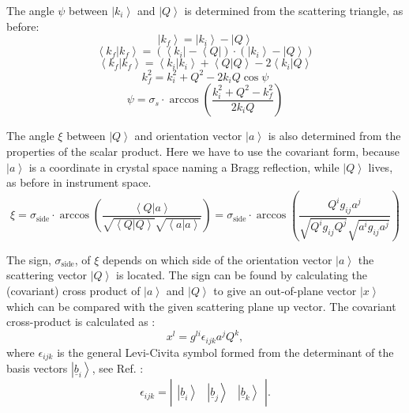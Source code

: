 The angle $\psi$ between $\left| k_i \right>$ and $\left| Q \right>$ is determined from the scattering triangle, as before:
\begin{equation}
	\left| k_f \right> = \left| k_i \right> - \left| Q \right> 
\end{equation}
\begin{equation} 
	\left< k_f | k_f \right> = \left( \left< k_i \right| - \left< Q \right| \right) \cdot \left( \left| k_i \right> - \left| Q \right> \right)
\end{equation}
\begin{equation}
	\left< k_f | k_f \right> = \left< k_i | k_i \right> + \left< Q | Q \right> - 2 \left< k_i | Q \right>
\end{equation}
\begin{equation}
	k_f^2 = k_i^2 + Q^2 - 2 k_i Q \cos \psi 
\end{equation}
\begin{equation}
	\boxed{ \psi = \sigma_s \cdot \arccos \left( \frac{k_i^2 + Q^2 - k_f^2}{2 k_i Q} \right) }
\end{equation}


\vspace{0.5cm}


The angle $\xi$ between $\left| Q \right>$ and orientation vector $\left| a \right>$ is also determined from the properties of the scalar product.
Here we have to use the covariant form, because $\left| a \right>$ is a coordinate in crystal space naming a Bragg reflection, while $\left| Q \right>$ lives, as before in instrument space.
\begin{equation} 
	\boxed{ \xi = 
\sigma_{\mathrm{side}} \cdot \arccos \left( \frac{ \left< Q | a \right> }{ \sqrt{\left< Q | Q \right>} \sqrt{\left< a | a \right>} } \right) = 
\sigma_{\mathrm{side}} \cdot \arccos \left( \frac{ Q^i g_{ij} a^j }{ \sqrt{Q^i g_{ij} Q^j} \sqrt{a^i g_{ij} a^j} } \right) } 
\label{eq:xi}
\end{equation}

The sign, $\sigma_{\mathrm{side}}$, of $\xi$ depends on which side of the orientation vector $\left| a \right>$ the scattering vector $\left| Q \right>$ is located. 
The sign can be found by calculating the (covariant) cross product of $\left| a \right>$ and $\left| Q \right>$ to give an out-of-plane vector $\left| x \right>$ which can be compared with the given scattering plane up vector.
The covariant cross-product is calculated as \cite[p. 815]{Arens2015}:
\begin{equation}
	x^l = g^{li} \epsilon_{ijk} a^j Q^k,
\end{equation}
where $\epsilon_{ijk}$ is the general Levi-Civita symbol formed from the determinant of the basis vectors $\left| \underline{b}_i \right>$, see Ref. \cite[p. 815]{Arens2015}:
\begin{equation}
	\epsilon_{ijk} = \left|
		\begin{array}{ccc} \left| 
			\underline{b}_i \right> & \left| \underline{b}_j \right> & \left| \underline{b}_k \right>
		\end{array} \right|.
\end{equation}



